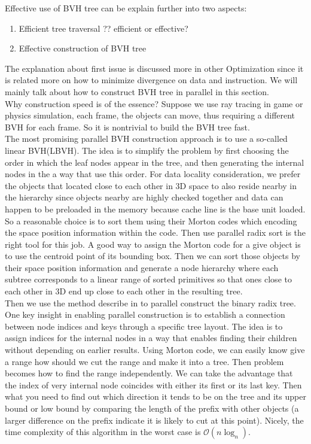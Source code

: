 \documentclass[a4paper,10pt]{article}
\begin{document}
Effective use of BVH tree can be explain further into two aspects:
\begin{enumerate}
    \item Efficient tree traversal ?? efficient or effective? 
    \item Effective construction of BVH tree
\end{enumerate}
The explanation about first issue is discussed more in other Optimization since it is related more on how to minimize divergence on data and instruction. We will mainly talk about how to construct BVH tree in parallel in this section. \\
Why construction speed is of the essence? Suppose we use ray tracing in game or physics simulation, each frame, the objects can move, thus requiring a different BVH for each frame. So it is nontrivial to build the BVH tree fast. \\
The most promising parallel BVH construction approach is to use a so-called linear BVH(LBVH). The idea is to simplify the problem by first choosing the order in which the leaf nodes appear in the tree, and then generating the internal nodes in the a way that use this order. For data locality consideration, we prefer the objects that located close to each other in 3D space to also reside nearby in the hierarchy since objects nearby are highly checked together and data can happen to be preloaded in the memory because cache line is the base unit loaded. So a reasonable choice is to sort them using their Morton codes which encoding the space position information within the code. Then use parallel radix sort is the right tool for this job. A good way to assign the Morton code for a give object is to use the centroid point of its bounding box. Then we can sort those objects by their space position information and generate a node hierarchy where each subtree corresponds to a linear range of sorted primitives so that ones close to each other in 3D end up close to each other in the resulting tree. \\
Then we use the method describe in \cite{karras2012maximizing} to parallel construct the binary radix tree. One key insight in enabling parallel construction is to establish a connection between node indices and keys through a specific tree layout. The idea is to assign indices for the internal nodes in a way that enables finding their children without depending on earlier results. Using Morton code, we can easily know give a range how should we cut the range and make it into a tree. Then problem becomes how to find the range independently. We can take the advantage that the index of very internal node coincides with either its first or its last key. Then what you need to find out which direction it tends to be on the tree and its upper bound or low bound by comparing the length of the prefix with other objects (a larger difference on the prefix indicate it is likely to cut at this point). Nicely, the time complexity of this algorithm in the worst case is $\mathcal{O}(n\log_n)$.
\end{document}
